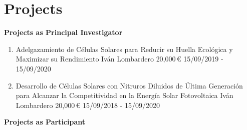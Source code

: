 \chapter*{Projects}\label{ch:Projects} 
\begin{Large}
	\noindent\textbf{Projects as Principal Investigator}
\end{Large}

\begin{enumerate}[leftmargin=2.5mm, labelsep=-5mm]
	\setcounter{enumi}{0}
	\item \begin{project}
	{Adelgazamiento de Células Solares para Reducir su Huella Ecológica y Maximizar su Rendimiento}
	{Iván Lombardero}
	{20,000\,\euro}
	{15/09/2019 - 15/09/2020}
	\end{project}
	\item \begin{project}
	{Desarrollo de Células Solares con Nitruros Diluidos de Última Generación para Alcanzar la Competitividad en la Energía Solar Fotovoltaica}
	{Iván Lombardero}
	{20,000\,\euro}
	{15/09/2018 - 15/09/2020}
	\end{project}
\end{enumerate}

\begin{Large}
	\noindent\textbf{Projects as Participant}
\end{Large}

